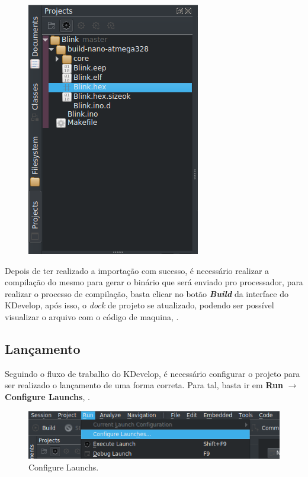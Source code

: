 \begin{figure}[!htb]
\begin{minipage}{.5\textwidth}
  \includegraphics[width=0.713\linewidth]{figuras/projects2.png}
  \label{fig:projects2}
\end{minipage}
\end{figure}

Depois de ter realizado a importação com sucesso, é necessário realizar a compilação do mesmo para gerar o binário que será enviado pro processador, para realizar o processo de compilação, basta clicar no botão \textbf{\textit{Build}} da interface do KDevelop, após isso, o \textit{dock} de projeto se atualizado, podendo ser possível visualizar o arquivo com o código de maquina, .

\subsection{Lançamento}

Seguindo o fluxo de trabalho do KDevelop, é necessário configurar o projeto para ser realizado o lançamento de uma forma correta. Para tal, basta ir em \textbf{Run} $\rightarrow$ \textbf{Configure Launchs}, .

\begin{figure}[!htb]
  \centering
  \caption[Configure Launchs]{Configure Launchs.}
  \label{fig:run}
  \includegraphics[width=1\textwidth]{figuras/run.png}
\end{figure}


